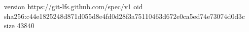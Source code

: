 version https://git-lfs.github.com/spec/v1
oid sha256:c44e1825248d871d055d8e4fd0d28f3a75110463d672e0ca5ed74e73074d0d3c
size 43840
